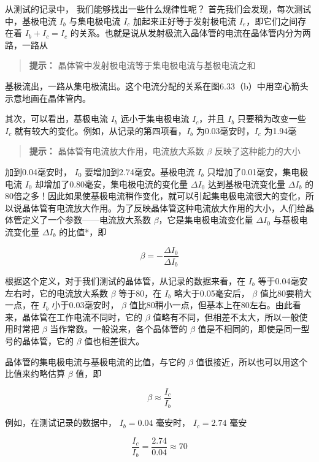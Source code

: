 从测试的记录中， 我们能够找出一些什么规律性呢？
首先我们会发现，每次测试中，基极电流 \(I_{b}\) 与集电极电流 \(I_{c}\)
加起来正好等于发射极电流 \(I_{e}\)，即它们之间存在着
\(I_{b}+I_{c}=I_{c}\)
的关系。也就是说从发射极流入晶体管的电流在晶体管内分为两路，一路从

\begin{quote}
\textbf{提示：} 晶体管中发射极电流等于集电极电流与基极电流之和
\end{quote}

基极流出，一路从集电极流出。这个电流分配的关系在图6.33（b）中用空心箭头示意地画在晶体管内。

其次，可以看出，基极电流 \(I_{b}\) 远小于集电极电流 \(I_{c}\)，并且
\(I_{b}\) 只要稍为改变一些 \(I_{c}\)
就有较大的变化。例如，从记录的第四项看，\(I_{b}\)
为0.03毫安时，\(I_{c}\) 为1.94毫

\begin{quote}
\textbf{提示：} 晶体管有电流放大作用，电流放大系数 \(\beta\)
反映了这种能力的大小
\end{quote}

加到0.04毫安时， \(I_{0}\) 要增加到2.74毫安。基极电流 \(I_{b}\)
只增加了0.01毫安，集电极电流 \(I_{0}\)
却增加了0.80毫安，集电极电流的变化量 \(\Delta I_{0}\) 达到基极电流变化量
\(\Delta I_{b}\)
的80倍之多！因此如果使基极电流稍作变化，就可以引起集电极电流很大的变化，所以说晶体管有电流放大作用。为了反映晶体管这种电流放大作用的大小，人们给晶体管定义了一个参数------电流放大系数
\(\beta\)，它是集电极电流变化量 \(\Delta I_{0}\) 与基极电流变化量
\(\Delta I_{b}\) 的比值*，即

\[
\beta = - \frac{\Delta I_{0}}{\Delta I_{b}} \tag{6.1}
\]

根据这个定义，对于我们测试的晶体管，从记录的数据来看，在 \(I_{b}\)
等于0.04毫安左右时，它的电流放大系数 \(\beta\) 等于80，在 \(I_{b}\)
略大于0.05毫安后， \(\beta\) 值比80要稍大一点，在 \(I_{b}\)
小于0.03毫安时， \(\beta\)
值比80稍小一点，但基本上在80左右。由此看来，晶体管在工作电流不同时，它的
\(\beta\) 值略有不同，但相差不太大，所以一般使用时常把 \(\beta\)
当作常数。一般说来，各个晶体管的 \(\beta\)
值是不相同的，即使是同一型号的晶体管，它的 \(\beta\) 值也相差很大。

晶体管的集电极电流与基极电流的比值，与它的 \(\beta\)
值很接近，所以也可以用这个比值来约略估算 \(\beta\) 值，即

\[
\beta \approx \frac{I_{c}}{I_{b}} \tag{6.2}
\]

例如，在测试记录的数据中， \(I_{b}=0.04\) 毫安时， \(I_{c}=2.74\) 毫安

\[
\frac{I_{c}}{I_{b}} = \frac{2.74}{0.04} \approx 70
\]

